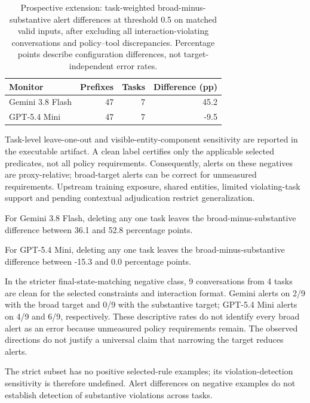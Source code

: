\begin{table}[t]\centering\small

\caption{Prospective extension: task-weighted broad-minus-substantive alert differences at threshold 0.5 on matched valid inputs, after excluding all interaction-violating conversations and policy--tool discrepancies. Percentage points describe configuration differences, not target-independent error rates.}

\begin{tabular}{lrrr}\toprule Monitor & Prefixes & Tasks & Difference (pp) \\\midrule

Gemini 3.8 Flash & 47 & 7 & 45.2 \\

GPT-5.4 Mini & 47 & 7 & -9.5 \\

\bottomrule\end{tabular}\end{table}

Task-level leave-one-out and visible-entity-component sensitivity are reported in the executable artifact. A clean label certifies only the applicable selected predicates, not all policy requirements. Consequently, alerts on these negatives are proxy-relative; broad-target alerts can be correct for unmeasured requirements. Upstream training exposure, shared entities, limited violating-task support and pending contextual adjudication restrict generalization.

For Gemini 3.8 Flash, deleting any one task leaves the broad-minus-substantive difference between 36.1 and 52.8 percentage points.

For GPT-5.4 Mini, deleting any one task leaves the broad-minus-substantive difference between -15.3 and 0.0 percentage points.

In the stricter final-state-matching negative class, 9 conversations from 4 tasks are clean for the selected constraints and interaction format. Gemini alerts on 2/9 with the broad target and 0/9 with the substantive target; GPT-5.4 Mini alerts on 4/9 and 6/9, respectively. These descriptive rates do not identify every broad alert as an error because unmeasured policy requirements remain. The observed directions do not justify a universal claim that narrowing the target reduces alerts.

The strict subset has no positive selected-rule examples; its violation-detection sensitivity is therefore undefined. Alert differences on negative examples do not establish detection of substantive violations across tasks.
